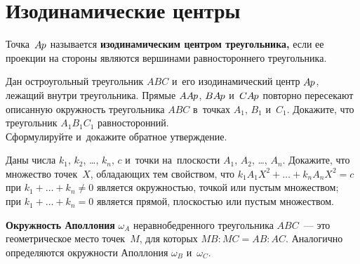 
\section*{Изодинамические центры}


\begingroup
    \def\Ap{A\mspace{-1mu}p}%

Точка~$\Ap$ называется \textbf{изодинамическим центром треугольника,} если ее
проекции на стороны являются вершинами равностороннего треугольника.

\begin{problems}

\item
\subproblem
Дан остроугольный треугольник $ABC$ и~его изодинамический центр $\Ap$, лежащий
внутри треугольника.
Прямые $A \Ap$, $B \Ap$ и~$C \Ap$ повторно пересекают описанную окружность
треугольника $ABC$ в~точках $A_1$, $B_1$ и~$C_1$.
Докажите, что треугольник $A_1 B_1 C_1$ равносторонний.
\\
\subproblem
Сформулируйте и~докажите обратное утверждение.

\item
Даны числа $k_{1}$, $k_{2}$, \ldots, $k_{n}$, $c$ и~точки на~плоскости
$A_{1}$, $A_{2}$, \ldots, $A_{n}$.
Докажите, что множество точек~$X$, обладающих тем свойством, что
$k_{1} {A_{1} X}^2 + \ldots + k_{n} {A_{n} X}^2 = c$
\\
\subproblem
при $k_{1} + \ldots + k_{n} \neq 0$ является окружностью, точкой или пустым
множеством;
\\
\subproblem
при $k_{1} + \ldots + k_{n} = 0$ является прямой, плоскостью или пустым
множеством.

\end{problems}

\textbf{Окружность Аполлония} $\omega_{A}$ неравнобедренного треугольника
$ABC$~--- это геометрическое место точек~$M$, для которых $MB : MC = AB : AC$.
Аналогично определяются окружности Аполлония $\omega_B$ и~$\omega_C$.

